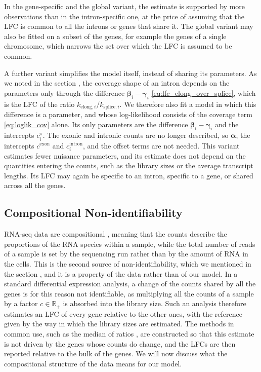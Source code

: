 \documentclass[11pt]{article}
\begin{document}
	In the gene-specific and the global variant, the estimate is supported by more observations than in the intron-specific one, at the price of assuming that the LFC is common to all the introns or genes that share it. The global variant may also be fitted on a subset of the genes, for example the genes of a single chromosome, which narrows the set over which the LFC is assumed to be common.

	A further variant simplifies the model itself, instead of sharing its parameters. As we noted in the section , the coverage shape of an intron depends on the parameters only through the difference $\boldsymbol{\beta}_i - \boldsymbol{\gamma}_i$ \eqref{eq:lfc_elong_over_splice}, which is the LFC of the ratio $k_{\mathrm{elong},i} / k_{\mathrm{splice},i}$. We therefore also fit a model in which this difference is a parameter, and whose log-likelihood consists of the coverage term \eqref{eq:loglik_cov} alone. Its only parameters are the difference $\boldsymbol{\beta}_i - \boldsymbol{\gamma}_i$ and the intercepts $c^{\pi}_{i}$. The exonic and intronic counts are no longer described, so $\boldsymbol{\alpha}$, the intercepts $c^{\mathrm{exon}}$ and $c^{\mathrm{intron}}_{i}$, and the offset terms are not needed. This variant estimates fewer nuisance parameters, and its estimate does not depend on the quantities entering the counts, such as the library sizes or the average transcript lengths. Its LFC may again be specific to an intron, specific to a gene, or shared across all the genes.
	
	\subsection{Compositional Non-identifiability} \label{subsec:compositional_nonidef}

	RNA-seq data are compositional \citep{quinnUnderstandingSequencingData2018}, meaning that the counts describe the proportions of the RNA species within a sample, while the total number of reads of a sample is set by the sequencing run rather than by the amount of RNA in the cells. This is the second source of non-identifiability, which we mentioned in the section , and it is a property of the data rather than of our model. In a standard differential expression analysis, a change of the counts shared by all the genes is for this reason not identifiable, as multiplying all the counts of a sample by a factor $c \in \mathbb{R}_+$ is absorbed into the library size. Such an analysis therefore estimates an LFC of every gene relative to the other ones, with the reference given by the way in which the library sizes are estimated. The methods in common use, such as the median of ratios \citep{andersDifferentialExpressionAnalysis2010}, are constructed so that this estimate is not driven by the genes whose counts do change, and the LFCs are then reported relative to the bulk of the genes. We will now discuss what the compositional structure of the data means for our model.
\end{document}
